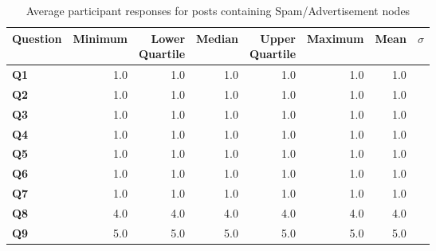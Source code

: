 \begin{table}
\centering
\caption{Average participant responses for posts containing Spam/Advertisement nodes}
\label{table:perception:spam/advertisement-average}
\begin{tabular}{ l | r | r | r | r | r | r | r}
\textbf{Question} & \textbf{Minimum} & \pbox{2cm}{\textbf{Lower}\\ \textbf{Quartile}} & \textbf{Median} & \pbox{2cm}{\textbf{Upper}\\ \textbf{Quartile}} & \textbf{Maximum} & \textbf{Mean} & \textbf{$\sigma$}\\
\hline
\textbf{Q1} &  1.0 & 1.0 & 1.0 & 1.0 & 1.0 & 1.0 &  \\
\hline
\textbf{Q2} &  1.0 & 1.0 & 1.0 & 1.0 & 1.0 & 1.0 &  \\
\hline
\textbf{Q3} &  1.0 & 1.0 & 1.0 & 1.0 & 1.0 & 1.0 &  \\
\hline
\textbf{Q4} &  1.0 & 1.0 & 1.0 & 1.0 & 1.0 & 1.0 &  \\
\hline
\textbf{Q5} &  1.0 & 1.0 & 1.0 & 1.0 & 1.0 & 1.0 &  \\
\hline
\textbf{Q6} &  1.0 & 1.0 & 1.0 & 1.0 & 1.0 & 1.0 &  \\
\hline
\textbf{Q7} &  1.0 & 1.0 & 1.0 & 1.0 & 1.0 & 1.0 &  \\
\hline
\textbf{Q8} &  4.0 & 4.0 & 4.0 & 4.0 & 4.0 & 4.0 &  \\
\hline
\textbf{Q9} &  5.0 & 5.0 & 5.0 & 5.0 & 5.0 & 5.0 &  \\
\end{tabular}
\end{table}




